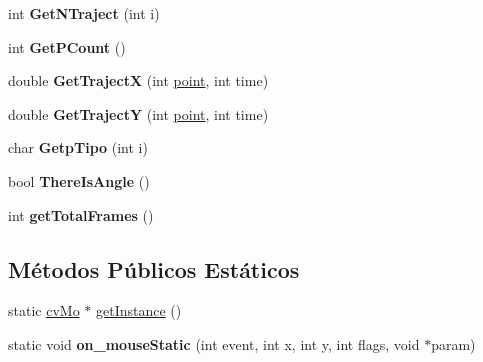 \begin{DoxyCompactItemize}
\item 
\hypertarget{classmodel_1_1cvMo_ac5979160e76b3b63d1ab8fb464561f60}{
int {\bfseries GetNTraject} (int i)}
\label{classmodel_1_1cvMo_ac5979160e76b3b63d1ab8fb464561f60}

\item 
\hypertarget{classmodel_1_1cvMo_afe8eb411031d1df69ea37fdcef7655be}{
int {\bfseries GetPCount} ()}
\label{classmodel_1_1cvMo_afe8eb411031d1df69ea37fdcef7655be}

\item 
\hypertarget{classmodel_1_1cvMo_a75aad254ca3f7f94274df51e11f6a0ae}{
double {\bfseries GetTrajectX} (int \hyperlink{structpoint}{point}, int time)}
\label{classmodel_1_1cvMo_a75aad254ca3f7f94274df51e11f6a0ae}

\item 
\hypertarget{classmodel_1_1cvMo_a310d74ca60e9785fd3ba1fa2a71426a3}{
double {\bfseries GetTrajectY} (int \hyperlink{structpoint}{point}, int time)}
\label{classmodel_1_1cvMo_a310d74ca60e9785fd3ba1fa2a71426a3}

\item 
\hypertarget{classmodel_1_1cvMo_a6c97cef53df42fa1f050bafd154ec099}{
char {\bfseries GetpTipo} (int i)}
\label{classmodel_1_1cvMo_a6c97cef53df42fa1f050bafd154ec099}

\item 
\hypertarget{classmodel_1_1cvMo_a28e2acf82d9be5ed117f8107b56d080c}{
bool {\bfseries ThereIsAngle} ()}
\label{classmodel_1_1cvMo_a28e2acf82d9be5ed117f8107b56d080c}

\item 
\hypertarget{classmodel_1_1cvMo_aabe38046409aa5e9d8e521b5c3c74caa}{
int {\bfseries getTotalFrames} ()}
\label{classmodel_1_1cvMo_aabe38046409aa5e9d8e521b5c3c74caa}

\end{DoxyCompactItemize}
\subsection*{Métodos Públicos Estáticos}
\begin{DoxyCompactItemize}
\item 
static \hyperlink{classmodel_1_1cvMo}{cvMo} $\ast$ \hyperlink{classmodel_1_1cvMo_a2157a33284be205a81f156b4bde126ee}{getInstance} ()
\item 
\hypertarget{classmodel_1_1cvMo_a6d714244c92d2046dd85115045ddcc87}{
static void {\bfseries on\_\-mouseStatic} (int event, int x, int y, int flags, void $\ast$param)}
\label{classmodel_1_1cvMo_a6d714244c92d2046dd85115045ddcc87}

\end{DoxyCompactItemize}
